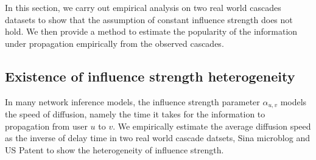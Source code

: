 In this section, we carry out empirical analysis on two real world cascades datasets to show that the assumption of constant influence strength does not hold. We then provide a method to estimate the popularity of the information under propagation empirically from the observed cascades. 

\subsection{Existence of influence strength heterogeneity}
In many network inference models, the influence strength parameter $\alpha_{u,v}$ models the speed of diffusion, namely the time it takes for the information to propagation from user $u$ to $v$.  We empirically estimate the average diffusion speed as the inverse of delay time in two real world cascade datsets, Sina microblog and US Patent to show the heterogeneity of influence strength. 

